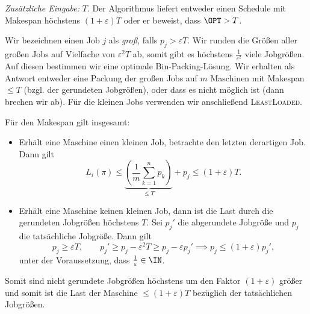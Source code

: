 \documentclass[language=ngerman,algolist]{TemplateLecture}
\begin{document}
\emph{Zusätzliche Eingabe:} $T$. Der Algorithmus liefert entweder einen Schedule mit Makespan höchstens $(1+\varepsilon)T$ oder er beweist, dass $\OPT > T$. 

Wir bezeichnen einen Job $j$ als \emph{groß}, falls $p_j > \varepsilon T$. Wir runden die Größen aller großen Jobs auf Vielfache von $\varepsilon^2 T$ ab, somit gibt es höchstens $\frac{1}{\varepsilon^2}$ viele Jobgrößen. Auf diesen bestimmen wir eine optimale Bin-Packing-Lösung. Wir erhalten als Antwort entweder eine Packung der großen Jobs auf $m$ Maschinen mit Makespan $\leq T$ (bzgl. der gerundeten Jobgrößen), oder dass es nicht möglich ist (dann brechen wir ab). Für die kleinen Jobs verwenden wir anschließend \textsc{LeastLoaded}.

Für den Makespan gilt insgesamt:
\begin{itemize}
    \item Erhält eine Maschine einen kleinen Job, betrachte den letzten derartigen Job. Dann gilt 
    \begin{equation*}
        L_i(\pi) \leq \underset{\leq T}{\underbrace{\left( \frac{1}{m}\sum_{k=1}^n p_k \right)}} + p_j \leq (1+\varepsilon)T.
    \end{equation*}
    \item Erhält eine Maschine keinen kleinen Job, dann ist die Last durch die gerundeten Jobgrößen höchstens $T$. Sei $p_j'$ die abgerundete Jobgröße und $p_j$ die tatsächliche Jobgröße. Dann gilt
    \begin{equation*}
        p_j \geq \varepsilon T, \quad \quad p_j' \geq p_j - \varepsilon^2 T \geq p_j - \varepsilon p_j' \implies p_j \leq (1+\varepsilon) p_j',
    \end{equation*}
    unter der Voraussetzung, dass $\frac{1}{\varepsilon} \in \IN$.
\end{itemize}
Somit sind nicht gerundete Jobgrößen höchstens um den Faktor $(1+\varepsilon)$ größer und somit ist die Last der Maschine $\leq (1+\varepsilon) T$ bezüglich der tatsächlichen Jobgrößen.
\end{document}

